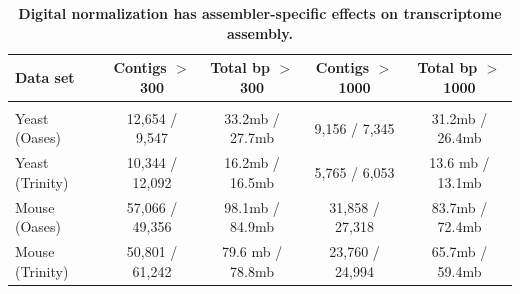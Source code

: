 \documentclass{pnastwo}
\begin{document}

\begin{table}[!ht]
\caption{
\bf{Digital normalization has assembler-specific effects on transcriptome
assembly.}}


\begin{tabular}{|l|c|c|c|c|}

Data set & Contigs $>$ 300 & Total bp $>$ 300 & Contigs $>$ 1000 & Total bp $>$ 1000 \\
\hline \\
Yeast (Oases) & 12,654 / 9,547 & 33.2mb / 27.7mb & 9,156 / 7,345 & 31.2mb / 26.4mb \\
Yeast (Trinity) & 10,344 / 12,092 & 16.2mb / 16.5mb & 5,765 / 6,053 & 13.6 mb / 13.1mb \\
Mouse (Oases) & 57,066 / 49,356 & 98.1mb / 84.9mb & 31,858 / 27,318 & 83.7mb / 72.4mb \\
Mouse (Trinity) & 50,801 / 61,242 & 79.6 mb / 78.8mb & 23,760 / 24,994 & 65.7mb / 59.4mb \\

\end{tabular}

\begin{flushleft}
\end{flushleft}
\label{tab:dntrans0}
\end{table}
\end{document}
